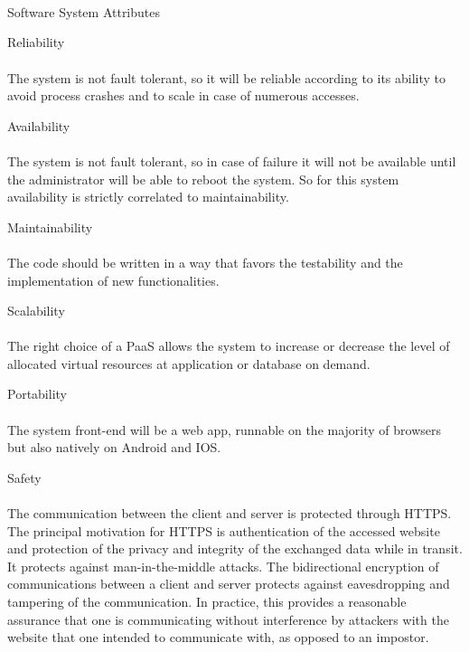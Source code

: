 \documentclass{article}
\begin{document}
\begin{legal}
\begin{legal}
\begin{legal}
\begin{tabular}{| m{3.5cm} | m{8cm}| }
				\hline
				\end{tabular}
				\\\\\\
    		\end{legal}
    		\item Software System Attributes \\
		\begin{legal}\bfseries
			\item Reliability
			\\\\
			{\normalfont The system is not fault tolerant, so it will be reliable according to its ability to avoid process crashes and to scale in case of numerous accesses.}
			\\
			\item Availability
			\\\\
			{\normalfont The system is not fault tolerant, so in case of failure it will not be available until the administrator will be able to reboot the system. So for this system availability is strictly correlated to maintainability.}
			\\
			\item Maintainability
			\\\\
			{\normalfont The code should be written in a way that favors the testability and the implementation of new functionalities.}
			\\
			\item Scalability
			\\\\
			{\normalfont The right choice of a PaaS allows the system to increase or decrease the level of allocated virtual resources at application or database on demand.}
			\\
			\item Portability
			\\\\
			{\normalfont The system front-end will be a web app, runnable on the majority of browsers but also natively on Android and IOS.}
			\\
			\item Safety
			\\\\
			{\normalfont The communication between the client and server is protected through HTTPS. The principal motivation for HTTPS is authentication of the accessed website and protection of the privacy and integrity of the exchanged data while in transit. It protects against man-in-the-middle attacks. The bidirectional encryption of communications between a client and server protects against eavesdropping and tampering of the communication. In practice, this provides a reasonable assurance that one is communicating without interference by attackers with the website that one intended to communicate with, as opposed to an impostor. }
			\\
			

\end{legal}
\end{legal}
\end{legal}
\end{document}
